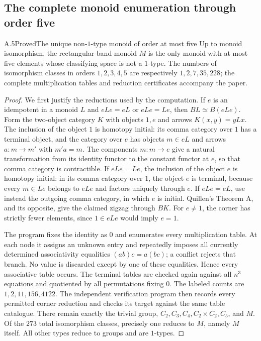 \subsection{The complete monoid enumeration through order five}
\begin{result}{A.5}{Proved}{The unique non-$1$-type monoid of order at most five}
Up to monoid isomorphism, the rectangular-band monoid $M$ is the only monoid with at most five elements whose classifying space is not a $1$-type. The numbers of isomorphism classes in orders $1,2,3,4,5$ are respectively $1,2,7,35,228$; the complete multiplication tables and reduction certificates accompany the paper.
\end{result}
\begin{proof}
We first justify the reductions used by the computation. If $e$ is an idempotent in a monoid $L$ and $eLe=eL$ or $eLe=Le$, then $BL\simeq B(eLe)$. Form the two-object category $K$ with objects $1,e$ and arrows $K(x,y)=yLx$. The inclusion of the object $1$ is homotopy initial: its comma category over $1$ has a terminal object, and the category over $e$ has objects $m\in eL$ and arrows $a:m\to m'$ with $m'a=m$. The components $m:m\to e$ give a natural transformation from its identity functor to the constant functor at $e$, so that comma category is contractible. If $eLe=Le$, the inclusion of the object $e$ is homotopy initial: in its comma category over $1$, the object $e$ is terminal, because every $m\in Le$ belongs to $eLe$ and factors uniquely through $e$. If $eLe=eL$, use instead the outgoing comma category, in which $e$ is initial. Quillen's Theorem A, and its opposite, give the claimed zigzag through $BK$. For $e\ne1$, the corner has strictly fewer elements, since $1\in eLe$ would imply $e=1$.

The program fixes the identity as $0$ and enumerates every multiplication table. At each node it assigns an unknown entry and repeatedly imposes all currently determined associativity equalities $(ab)c=a(bc)$; a conflict rejects that branch. No value is discarded except by one of these equalities. Hence every associative table occurs. The terminal tables are checked again against all $n^3$ equations and quotiented by all permutations fixing $0$. The labeled counts are $1,2,11,156,4122$. The independent verification program then records every permitted corner reduction and checks its target against the same table catalogue. There remain exactly the trivial group, $C_2,C_3,C_4,C_2\times C_2,C_5$, and $M$. Of the $273$ total isomorphism classes, precisely one reduces to $M$, namely $M$ itself. All other types reduce to groups and are $1$-types.


\end{proof}

